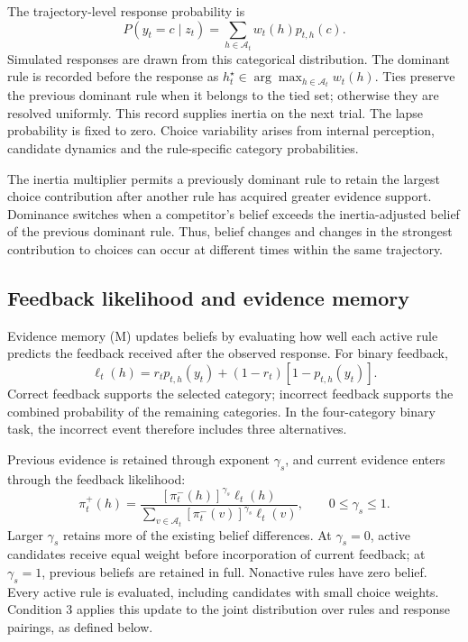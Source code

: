 The trajectory-level response probability is
\begin{equation}
P(y_t=c\mid z_t)=\sum_{h\in\mathcal A_t}w_t(h)p_{t,h}(c).
\label{eq:choice-mixture}
\end{equation}
Simulated responses are drawn from this categorical distribution. The dominant rule is recorded before the response as $h_t^{\star}\in\arg\max_{h\in\mathcal A_t}w_t(h)$. Ties preserve the previous dominant rule when it belongs to the tied set; otherwise they are resolved uniformly. This record supplies inertia on the next trial. The lapse probability is fixed to zero. Choice variability arises from internal perception, candidate dynamics and the rule-specific category probabilities.

The inertia multiplier permits a previously dominant rule to retain the largest choice contribution after another rule has acquired greater evidence support. Dominance switches when a competitor's belief exceeds the inertia-adjusted belief of the previous dominant rule. Thus, belief changes and changes in the strongest contribution to choices can occur at different times within the same trajectory.

\subsection*{Feedback likelihood and evidence memory}
\label{m:memory}

Evidence memory (M) updates beliefs by evaluating how well each active rule predicts the feedback received after the observed response. For binary feedback,
\begin{equation}
\ell_t(h)=r_tp_{t,h}(y_t)+(1-r_t)[1-p_{t,h}(y_t)].
\label{eq:feedback-likelihood}
\end{equation}
Correct feedback supports the selected category; incorrect feedback supports the combined probability of the remaining categories. In the four-category binary task, the incorrect event therefore includes three alternatives.

Previous evidence is retained through exponent $\gamma_s$, and current evidence enters through the feedback likelihood:
\begin{equation}
\pi_t^+(h)=
\frac{[\pi_t^-(h)]^{\gamma_s}\ell_t(h)}
{\sum_{v\in\mathcal A_t}[\pi_t^-(v)]^{\gamma_s}\ell_t(v)},
\qquad 0\leq\gamma_s\leq1.
\label{eq:evidence-memory}
\end{equation}
Larger $\gamma_s$ retains more of the existing belief differences. At $\gamma_s=0$, active candidates receive equal weight before incorporation of current feedback; at $\gamma_s=1$, previous beliefs are retained in full. Nonactive rules have zero belief. Every active rule is evaluated, including candidates with small choice weights. Condition 3 applies this update to the joint distribution over rules and response pairings, as defined below.

